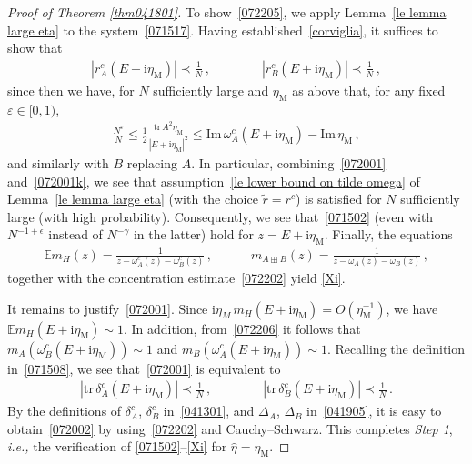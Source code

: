 \documentclass[10pt,reqno]{amsart}
\numberwithin{equation}{section}
\theoremstyle{plain}
\numberwithin{kevin}{section}
\theoremstyle{remark}
\newcommand{\im}{\mathrm{Im}\,}
\newcommand{\ii}{\mathrm{i}}
\newcommand{\ntr}{\mathrm{tr}\,}
\newcommand{\ie}{\emph{i.e., }}
\newcommand{\wh}{\widehat}
\begin{document}
\begin{proof}[Proof of Theorem \ref{thm041801}]
To show~\eqref{072205}, we apply Lemma~\ref{le lemma large eta} to the system~\eqref{071517}. Having established~\eqref{corviglia}, it suffices to show that
\begin{align}
|r_A^c(E+\ii \eta_{\mathrm{M}})|\prec \frac{1}{N} \,,\qquad\qquad |r_B^c(E+\ii \eta_{\mathrm{M}})|\prec \frac{1}{N}\,,  \label{072001}
\end{align}
since then we have, for $N$ sufficiently large and $\eta_{\mathrm{M}}$ as above that, for any fixed $\varepsilon\in[0,1)$,
\begin{align}\label{072001k}
\frac{N^\varepsilon}{N}\le\frac{1}{2}\frac{\ntr A^2\eta_{\mathrm{M}}}{|E+\ii\eta_{\mathrm{M}}|^2}\le \im \omega_A^c(E+\ii\eta_{\mathrm{M}})-\im \eta_{\mathrm{M}}\,,
\end{align}
and similarly with $B$ replacing $A$. In particular, combining~\eqref{072001} and~\eqref{072001k}, we see that assumption~\eqref{le lower bound on tilde omega} of Lemma~\ref{le lemma large eta} (with the choice $\widetilde r = r^c$) is satisfied for $N$ sufficiently large (with high probability). Consequently, we see that~\eqref{071502} 
(even with $N^{-1+\epsilon}$ instead of $N^{-\gamma}$ in the latter) hold for 
 $z=E+\ii \eta_{\mathrm{M}}$. Finally, the equations
\begin{align}\label{le ww}
\mathbb{E} m_H(z)=\frac{1}{z-\omega_A^c(z)-\omega_B^c(z)}\,,\qquad \quad m_{A\boxplus B}(z)=\frac{1}{z-\omega_A(z)-\omega_B(z)}\,,
\end{align}
together with the concentration estimate~\eqref{072202} yield \eqref{Xi}.

It remains to justify~\eqref{072001}. Since $\ii\eta_{M}\,m_H(E+\ii\eta_{\mathrm{M}})=O(\eta_{\mathrm{M}}^{-1})$, we have $\mathbb{E}m_H(E+\ii \eta_{\mathrm{M}})\sim 1$. In addition, from~\eqref{072206} it follows that $m_A(\omega_B^c(E+\ii\eta_{\mathrm{M}}))\sim 1$ and $m_B(\omega_A^c(E+\ii\eta_{\mathrm{M}}))\sim 1$. Recalling the definition in~\eqref{071508}, we see that~\eqref{072001} is equivalent to 
\begin{align}
|\ntr \delta_A^c(E+\ii \eta_{\mathrm{M}})|\prec \frac{1}{N} \,,\qquad \qquad |\ntr \delta_B^c(E+\ii \eta_{\mathrm{M}})|\prec \frac{1}{N}\,.  \label{072002}
\end{align}
By the definitions of $\delta_A^c$, $\delta_B^c$ in~\eqref{041301}, and $\Delta_A$, $\Delta_B$ in~\eqref{041905}, it is easy to obtain~\eqref{072002} by using~\eqref{072202} and Cauchy--Schwarz.
This completes {\it Step 1}, \ie the verification of \eqref{071502}--\eqref{Xi} for $\wh\eta=\eta_{\mathrm{M}}$.



\end{proof}
\end{document}
